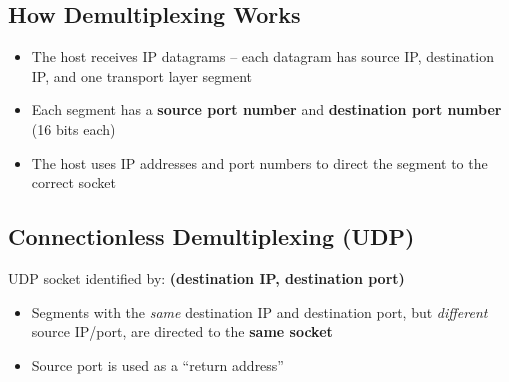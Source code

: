 \subsection{How Demultiplexing Works}

\begin{itemize}[noitemsep]
    \item The host receives IP datagrams -- each datagram has source IP, destination IP, and one transport layer segment
    \item Each segment has a \textbf{source port number} and \textbf{destination port number} (16 bits each)
    \item The host uses IP addresses and port numbers to direct the segment to the correct socket
\end{itemize}

\begin{center}
\end{center}

\subsection{Connectionless Demultiplexing (UDP)}

\begin{keybox}
UDP socket identified by: \textbf{(destination IP, destination port)}
\begin{itemize}[noitemsep]
    \item Segments with the \emph{same} destination IP and destination port, but \emph{different} source IP/port, are directed to the \textbf{same socket}
    \item Source port is used as a ``return address''
\end{itemize}
\end{keybox}

